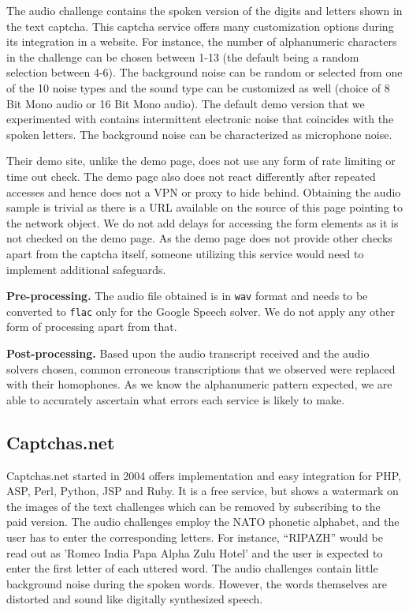 The audio challenge contains the spoken version of the digits and letters shown in the text captcha.
This captcha service offers many customization options during its integration in a website. For instance, 
the number of alphanumeric characters in the challenge can be chosen between
1-13 (the default being a random selection between 4-6). The background noise can be random or selected from one of 
the 10 noise types and the sound type can be customized as well (choice of 8 Bit Mono audio or 16 Bit 
Mono audio). The default demo version that we experimented with contains intermittent electronic noise that 
coincides with the spoken letters. The background noise can be characterized as microphone noise. 

Their demo site, unlike the \re demo page, does not use any form of rate limiting or
time out check. The demo page also does not react differently after repeated accesses and hence does not a VPN 
or proxy to hide behind. Obtaining the audio sample is trivial as there is a URL available
on the source of this page pointing to the network object. We do 
not add delays for accessing the form elements as it is not checked on the demo page. As the demo page does not provide other
checks apart from the captcha itself, someone utilizing this service would need to implement
additional safeguards.

\textbf{Pre-processing.} The audio file obtained is in \texttt{wav} format and needs to be converted to \texttt{flac} only for 
the Google Speech solver. We do not apply any other form of processing apart from that.


\textbf{Post-processing.} Based upon the audio transcript received and the audio solvers chosen, common erroneous transcriptions
that we observed were replaced with their homophones.  As we know the alphanumeric pattern
expected, we are able to accurately ascertain what errors each service is likely to make.


\subsection{Captchas.net}

Captchas.net started in 2004 offers implementation and easy integration for PHP, ASP, Perl, 
Python, JSP and Ruby. It is a free service, but shows a watermark on the images of the text challenges 
which can be removed by subscribing to the paid version. 
The audio challenges employ the NATO phonetic alphabet, and the user has to enter the corresponding letters.
For instance, ``RIPAZH'' would be read out as 'Romeo India Papa Alpha Zulu Hotel' and the user is expected 
to enter the first letter of each uttered word. The audio challenges contain little background noise during the 
spoken words. However, the words themselves are distorted and sound like digitally synthesized speech.

